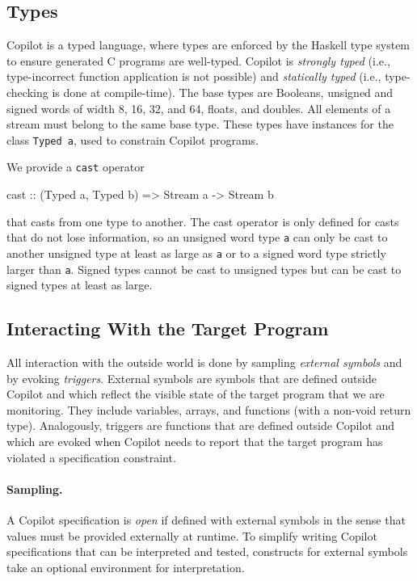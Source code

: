 \documentclass[]{article}
\theoremstyle{example}
\begin{document}
\subsection{Types} \label{sec:types}

Copilot is a typed language, where types are enforced by the Haskell type system
to ensure generated C programs are well-typed.  Copilot is \emph{strongly typed}
(i.e., type-incorrect function application is not possible) and \emph{statically
  typed} (i.e., type-checking is done at compile-time).  The base types are
Booleans, unsigned and signed words of width 8, 16, 32, and 64, floats, and
doubles.  All elements of a stream must belong to the same base
type.  These types have instances for the class {\tt Typed a}, used to constrain
Copilot programs.

We provide a {\tt cast} operator
%
\begin{code}
cast :: (Typed a, Typed b) => Stream a -> Stream b  
\end{code}
%
that casts from one type to another.  The cast operator is only defined for
casts that do not lose information, so an unsigned word type {\tt a} can only be cast to another unsigned  type at least as large as {\tt a} or to a signed word type
strictly larger than {\tt a}.  Signed types cannot be cast to unsigned types but
can be cast to signed types at least as large.

\subsection{Interacting With the Target Program}
\label{sec:interacting}

All interaction with the outside world is done by sampling \emph{external
  symbols} and by evoking \emph{triggers}.  External symbols are symbols that
are defined outside Copilot and which reflect the visible state of the target
program that we are monitoring.  They include variables, arrays, and functions
(with a non-void return type).  Analogously, triggers are functions that are
defined outside Copilot and which are evoked when Copilot needs to report that
the target program has violated a specification constraint.

\paragraph{Sampling.}
A Copilot specification is \emph{open} if defined with external symbols in the
sense that values must be provided externally at runtime.  To simplify writing
Copilot specifications that can be interpreted and tested, constructs for
external symbols take an optional environment for interpretation.
\end{document}
